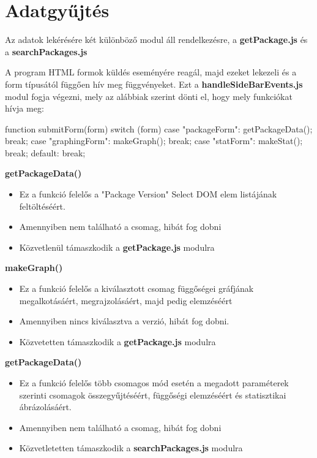 \pagebreak

\section{Adatgyűjtés}

Az adatok lekérésére két különböző modul áll rendelkezésre, a \textbf{getPackage.js} és a \textbf{searchPackages.js}

A program HTML formok küldés eseményére reagál, majd ezeket lekezeli és a form típusától függően hív meg függvényeket. Ezt a \textbf{handleSideBarEvents.js} modul fogja végezni, mely az alábbiak szerint dönti el, hogy mely funkciókat hívja meg:

\begin{cpp}
function submitForm(form){
	switch (form) {
		case "packageForm":
		getPackageData();
		break;
		case "graphingForm":
		makeGraph();
		break;
		case "statForm":
		makeStat();
		break;
		default:
		break;
	}
}
\end{cpp}

\noindent\textbf{getPackageData()}
\begin{itemize}
	\item Ez a funkció felelős a "Package Version" Select DOM elem listájának feltöltéséért. 
	\item Amennyiben nem található a csomag, hibát fog dobni
	\item Közvetlenül támaszkodik a \textbf{getPackage.js} modulra
\end{itemize}

\noindent\textbf{makeGraph()}
\begin{itemize}
	\item Ez a funkció felelős a kiválasztott csomag függőségei gráfjának megalkotásáért, megrajzolásáért, majd pedig elemzéséért
	\item Amennyiben nincs kiválasztva a verzió, hibát fog dobni.
	\item Közvetetten támaszkodik a \textbf{getPackage.js} modulra
\end{itemize}

\noindent\textbf{getPackageData()}
\begin{itemize}
	\item Ez a funkció felelős több csomagos mód esetén a megadott paraméterek szerinti csomagok összegyűjtéséért, függőségi elemzéséért és statisztikai ábrázolásáért.
	\item Amennyiben nem található a csomag, hibát fog dobni
	\item Közvetletetten támaszkodik a \textbf{searchPackages.js} modulra
\end{itemize}


